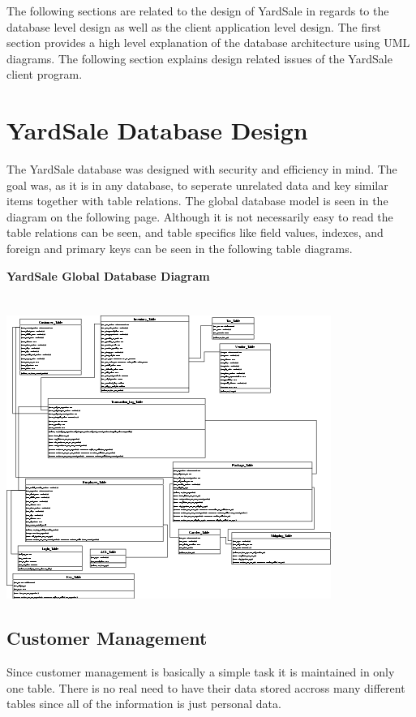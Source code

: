 \documentclass{report}
\begin{document}
	The following sections are related to the design of YardSale
	in regards to the database level design as well as the client
	application level design. The first section provides a high level
	explanation of the database architecture using UML diagrams. The
	following section explains design related issues of the YardSale
	client program.

\section{YardSale Database Design}

	The YardSale database was designed with security and efficiency in
	mind. The goal was, as it is in any database, to seperate unrelated
	data and key similar items together with table relations. The global
	database model is seen in the diagram on the following page. Although
	it is not necessarily easy to read the table relations can be seen, and
	table specifics like field values, indexes, and foreign and primary keys
	can be seen in the following table diagrams.

	\newpage

	\bf{YardSale Global Database Diagram}\\
	\\
	\\
	\includegraphics{Database_Layout.png}

	\newpage

	\subsection{Customer Management}

	Since customer management is basically a simple task it is maintained in only
	one table. There is no real need to have their data stored accross many
	different tables since all of the information is just personal data.
\end{document}
